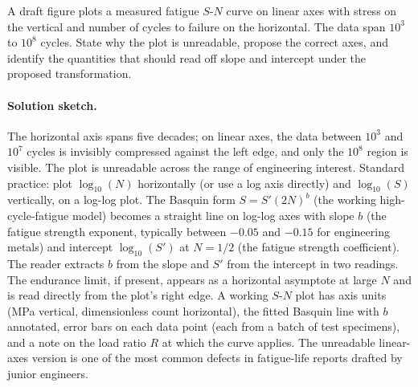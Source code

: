 \begin{exercise}
A draft figure plots a measured fatigue $S$-$N$ curve on linear axes
with stress on the vertical and number of cycles to failure on the
horizontal. The data span $10^{3}$ to $10^{8}$ cycles. State why the
plot is unreadable, propose the correct axes, and identify the
quantities that should read off slope and intercept under the
proposed transformation.

\paragraph{Solution sketch.}
The horizontal axis spans five decades; on linear axes, the data
between $10^{3}$ and $10^{7}$ cycles is invisibly compressed
against the left edge, and only the $10^{8}$ region is visible.
The plot is unreadable across the range of engineering interest.
Standard practice: plot $\log_{10}(N)$ horizontally (or use a log
axis directly) and $\log_{10}(S)$ vertically, on a log-log plot.
The Basquin form $S = S' (2N)^{b}$ (the working
high-cycle-fatigue model) becomes a straight line on log-log axes
with slope $b$ (the fatigue strength exponent, typically between
$-0.05$ and $-0.15$ for engineering metals) and intercept
$\log_{10}(S')$ at $N = 1/2$ (the fatigue strength coefficient).
The reader extracts $b$ from the slope and $S'$ from the intercept
in two readings. The endurance limit, if present, appears as a
horizontal asymptote at large $N$ and is read directly from the
plot's right edge. A working $S$-$N$ plot has axis units (MPa
vertical, dimensionless count horizontal), the fitted Basquin line
with $b$ annotated, error bars on each data point (each from a
batch of test specimens), and a note on the load ratio $R$ at which
the curve applies. The unreadable linear-axes version is one of
the most common defects in fatigue-life reports drafted by
junior engineers.
\end{exercise}

